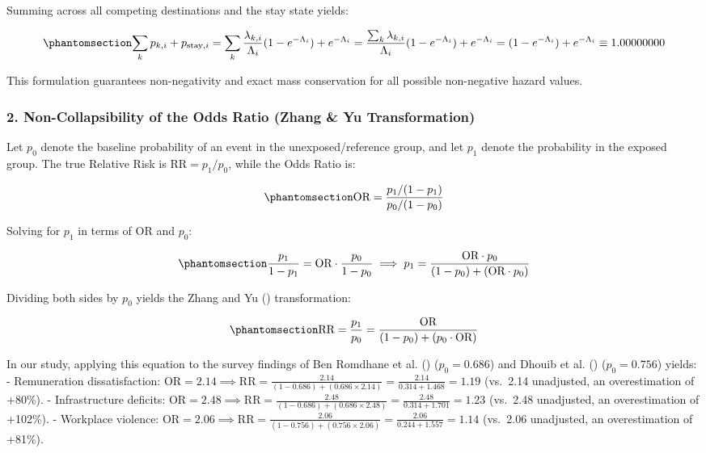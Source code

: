 \documentclass[
  11pt,
  a4paper]{article}
\begin{document}
Summing across all competing destinations and the stay state yields:

\begin{equation}\protect\phantomsection\label{eq-app-proof}{\sum_{k} p_{k, i} + p_{\text{stay}, i} = \sum_{k} \frac{\lambda_{k, i}}{\Lambda_i} (1 - e^{-\Lambda_i}) + e^{-\Lambda_i} = \frac{\sum_k \lambda_{k, i}}{\Lambda_i} (1 - e^{-\Lambda_i}) + e^{-\Lambda_i} = (1 - e^{-\Lambda_i}) + e^{-\Lambda_i} \equiv 1.00000000}\end{equation}

This formulation guarantees non-negativity and exact mass conservation
for all possible non-negative hazard values.

\subsubsection{2. Non-Collapsibility of the Odds Ratio (Zhang \& Yu
Transformation)}\label{non-collapsibility-of-the-odds-ratio-zhang-yu-transformation}

Let \(p_0\) denote the baseline probability of an event in the
unexposed/reference group, and let \(p_1\) denote the probability in the
exposed group. The true Relative Risk is \(\text{RR} = p_1 / p_0\),
while the Odds Ratio is:

\begin{equation}\protect\phantomsection\label{eq-app-or-def}{\text{OR} = \frac{p_1 / (1 - p_1)}{p_0 / (1 - p_0)}}\end{equation}

Solving for \(p_1\) in terms of \(\text{OR}\) and \(p_0\):

\begin{equation}\protect\phantomsection\label{eq-app-p1-solve}{\frac{p_1}{1 - p_1} = \text{OR} \cdot \frac{p_0}{1 - p_0} \implies p_1 = \frac{\text{OR} \cdot p_0}{(1 - p_0) + (\text{OR} \cdot p_0)}}\end{equation}

Dividing both sides by \(p_0\) yields the Zhang and Yu
() transformation:

\begin{equation}\protect\phantomsection\label{eq-app-rr-zhang}{\text{RR} = \frac{p_1}{p_0} = \frac{\text{OR}}{(1 - p_0) + (p_0 \cdot \text{OR})}}\end{equation}

In our study, applying this equation to the survey findings of Ben
Romdhane et al. () (\(p_0 = 0.686\))
and Dhouib et al. () (\(p_0 = 0.756\))
yields: - Remuneration dissatisfaction:
\(\text{OR} = 2.14 \implies \text{RR} = \frac{2.14}{(1 - 0.686) + (0.686 \times 2.14)} = \frac{2.14}{0.314 + 1.468} = 1.19\)
(vs.~2.14 unadjusted, an overestimation of +80\%). - Infrastructure
deficits:
\(\text{OR} = 2.48 \implies \text{RR} = \frac{2.48}{(1 - 0.686) + (0.686 \times 2.48)} = \frac{2.48}{0.314 + 1.701} = 1.23\)
(vs.~2.48 unadjusted, an overestimation of +102\%). - Workplace
violence:
\(\text{OR} = 2.06 \implies \text{RR} = \frac{2.06}{(1 - 0.756) + (0.756 \times 2.06)} = \frac{2.06}{0.244 + 1.557} = 1.14\)
(vs.~2.06 unadjusted, an overestimation of +81\%).
\end{document}
